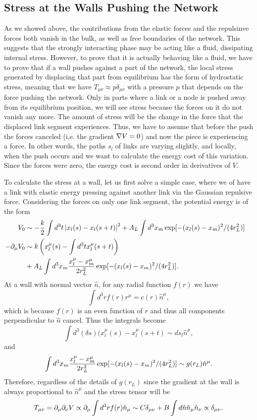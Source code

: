 \documentclass[endfloats,nofootinbib,preprint,floatfix,titlepage,superscriptaddress]{revtex4} %
\begin{document}
\subsection{Stress at the Walls Pushing the Network}
As we showed above, the contributions from the elastic forces and the repulsinve forces both vanish in the bulk, as well as free boundaries of the network. This suggests that the strongly interacting phase may be acting like a fluid, dissipating internal stress. 
However, to prove that it is actually behaving like a fluid, we have to prove that if a wall pushes against a part of the network, the local stress generated by displacing that part from equilibrium has the form of hydrostatic stress, meaning that we have $T_{\mu\nu} \approx p \delta_{\mu\nu}$ with a pressure $p$ that depends on the force pushing the network. 
Only in parts where a link or a node is pushed away from its equilibrium position, we will see stress because the forces on it do not vanish any more.
The amount of stress will be the change in the force that the displaced link segment experiences.
Thus, we have to assume that before the push the forces canceled (i.e. the gradient $\nabla V = 0$) and now the piece is experiencing a force. 
In other words, the paths $s_l$ of links are varying slightly, and locally, when the push occurs and we want to calculate the energy cost of this variation.
Since the forces were zero, the energy cost is second order in derivatives of $V$. 

To calculate the stress at a wall, let us first solve a simple case, where we of have a link with elastic energy pressing against another link via the Gaussian repulsive force. 
Considering the forces on only one link segment, the potential energy is of the form
\begin{align}
    V_0 &\sim -{k\over 2} \int d^3t \left|x_l(s)- x_l(s+t)\right|^2 + A_L \int d^3 x_m \exp[-(x_l(s) - x_m)^2/ (4r_L^2)]   \cr 
    -\partial_\mu V_0 & \sim k \left(x_l^\mu(s)- \int d^3t x^\mu_l(s+t)\right) \cr & + A_L \int d^3 x_m {x_l^\mu-x_m^\mu  \over 2r_L^2} \exp[-(x_l(s) - x_m)^2/ (4r_L^2)].
\end{align}
At a wall with normal vector $\hat{n}$, for any radial function $f(r)$ we have 
\[\int d^3 r f(r) r^\mu = c(r) \hat{n}^\mu, \]
which is because $f(r) $ is an even function of $r$ and thus all components perpendicular to $\hat{n}$ cancel. 
Thus the integrals become 
\[\int d^3(\delta s) (x_l^\mu (s) - x^\mu_l(s+t) \sim ds_l\hat{n}^\mu,\]
and  
\[\int d^3 x_m {x_l^\mu-x_m^\mu  \over 2r_L^2} \exp[-(x_l(s) - x_m)^2/ (4r_L^2)] \sim g(r_L) \hat{n}^\mu . \]
Therefore, regardless of the details of $g(r_L)$ since the gradient at the wall is always proportional to $\hat{n}^\mu $ and the stress tensor will be 
\[T_{\mu\nu} = \partial_\mu\partial_\nu V \propto \partial_\mu \int d^3r f(r)\hat{n}_\mu \sim C \delta_{\mu\nu} + B\int d\hat{n} \hat{n}_\mu \hat{n}_\nu \propto \delta_{\mu\nu}. \]
\end{document}
